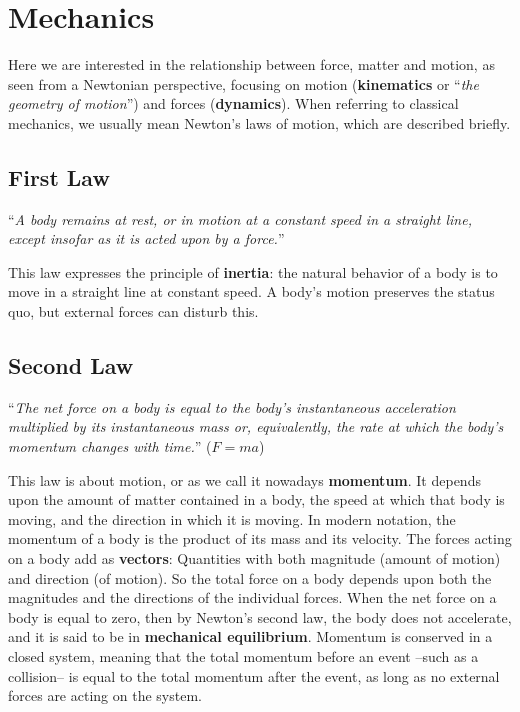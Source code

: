 \section{Mechanics}\label{sec:mechanics}

Here we are interested in the relationship between force, matter and motion, as seen from a Newtonian perspective, focusing on motion (\textbf{kinematics} or ``\textit{the geometry of motion}'') and forces (\textbf{dynamics}).
When referring to classical mechanics, we usually mean Newton's laws of motion, which are described briefly.

\subsection{First Law}\label{subsec:first-law}

``\textit{A body remains at rest, or in motion at a constant speed in a straight line, except insofar as it is acted upon by a force.}''

This law expresses the principle of \textbf{\gls{inertia}}: the natural behavior of a body is to move in a straight line at constant speed.
A body's motion preserves the status quo, but external forces can disturb this.

\subsection{Second Law}\label{subsec:second-law}

``\textit{The net force on a body is equal to the body's instantaneous acceleration multiplied by its instantaneous mass or, equivalently, the rate at which the body's momentum changes with time.}'' ($F = ma$)

This law is about motion, or as we call it nowadays \textbf{\gls{momentum}}.
It depends upon the amount of matter contained in a body, the speed at which that body is moving, and the direction in which it is moving.
In modern notation, the momentum of a body is the product of its mass and its velocity.
The forces acting on a body add as \textbf{\gls{vector}s}: Quantities with both magnitude (amount of motion) and direction (of motion).
So the total force on a body depends upon both the magnitudes and the directions of the individual forces.
When the net force on a body is equal to zero, then by Newton's second law, the body does not accelerate, and it is said to be in \textbf{mechanical equilibrium}.
Momentum is conserved in a closed system, meaning that the total momentum before an event --such as a collision-- is equal to the total momentum after the event, as long as no external forces are acting on the system.

